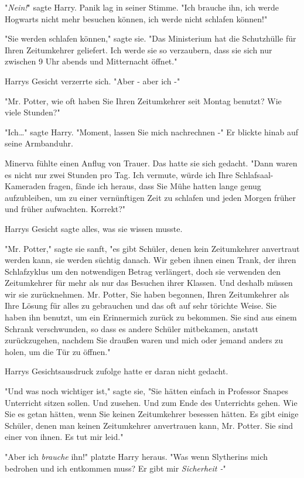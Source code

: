 {"\emph{Nein!}" sagte Harry. Panik lag in seiner Stimme. "Ich brauche ihn, ich werde Hogwarts nicht mehr besuchen können, ich werde nicht schlafen können!"

"Sie werden schlafen können," sagte sie. "Das Ministerium hat die Schutzhülle für Ihren Zeitumkehrer geliefert. Ich werde sie so verzaubern, dass sie sich nur zwischen 9 Uhr abends und Mitternacht öffnet."

Harrys Gesicht verzerrte sich. "Aber - aber ich -"

"Mr. Potter, wie oft haben Sie Ihren Zeitumkehrer seit Montag benutzt? Wie viele Stunden?"

"Ich…" sagte Harry. "Moment, lassen Sie mich nachrechnen -" Er blickte hinab auf seine Armbanduhr.

Minerva fühlte einen Anflug von Trauer. Das hatte sie sich gedacht. "Dann waren es nicht nur zwei Stunden pro Tag. Ich vermute, würde ich Ihre Schlafsaal-Kameraden fragen, fände ich heraus, dass Sie Mühe hatten lange genug aufzubleiben, um zu einer vernünftigen Zeit zu schlafen und jeden Morgen früher und früher aufwachten. Korrekt?"

Harrys Gesicht sagte alles, was sie wissen musste.

"Mr. Potter," sagte sie sanft, "es gibt Schüler, denen kein Zeitumkehrer anvertraut werden kann, sie werden süchtig danach. Wir geben ihnen einen Trank, der ihren Schlafzyklus um den notwendigen Betrag verlängert, doch sie verwenden den Zeitumkehrer für mehr als nur das Besuchen ihrer Klassen. Und deshalb müssen wir sie zurücknehmen. Mr. Potter, Sie haben begonnen, Ihren Zeitumkehrer als Ihre Lösung für alles zu gebrauchen und das oft auf sehr törichte Weise. Sie haben ihn benutzt, um ein Erinnermich zurück zu bekommen. Sie sind aus einem Schrank verschwunden, so dass es andere Schüler mitbekamen, anstatt zurückzugehen, nachdem Sie draußen waren und mich oder jemand anders zu holen, um die Tür zu öffnen."

Harrys Gesichtsausdruck zufolge hatte er daran nicht gedacht.

"Und was noch wichtiger ist," sagte sie, "Sie hätten einfach in Professor Snapes Unterricht sitzen sollen. Und zusehen. Und zum Ende des Unterrichts gehen. Wie Sie es getan hätten, wenn Sie keinen Zeitumkehrer besessen hätten. Es gibt einige Schüler, denen man keinen Zeitumkehrer anvertrauen kann, Mr. Potter. Sie sind einer von ihnen. Es tut mir leid."

"Aber ich \emph{brauche} ihn!" platzte Harry heraus. "Was wenn Slytherins mich bedrohen und ich entkommen muss? Er gibt mir \emph{Sicherheit -}"

}

